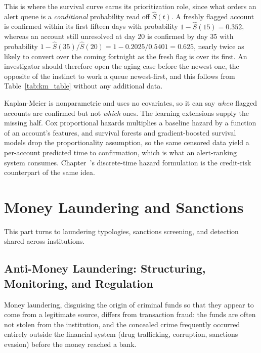 \documentclass[../ai_in_finance]{subfiles}
\begin{document}
This is where the survival curve earns its prioritization role, since what orders an alert queue is a \emph{conditional} probability read off $\hat S(t)$. A freshly flagged account is confirmed within its first fifteen days with probability $1 - \hat S(15) = 0.352$, whereas an account still unresolved at day 20 is confirmed by day 35 with probability $1 - \hat S(35)/\hat S(20) = 1 - 0.2025/0.5401 = 0.625$, nearly twice as likely to convert over the coming fortnight as the fresh flag is over its first. An investigator should therefore open the aging case before the newest one, the opposite of the instinct to work a queue newest-first, and this follows from Table~\ref{tab:km_table} without any additional data.

Kaplan-Meier is nonparametric and uses no covariates, so it can say \emph{when} flagged accounts are confirmed but not \emph{which} ones. The learning extensions supply the missing half. Cox proportional hazards multiplies a baseline hazard by a function of an account's features, and survival forests and gradient-boosted survival models drop the proportionality assumption, so the same censored data yield a per-account predicted time to confirmation, which is what an alert-ranking system consumes. Chapter~'s discrete-time hazard formulation is the credit-risk counterpart of the same idea.

\section{Money Laundering and Sanctions}

This part turns to laundering typologies, sanctions screening, and detection shared across institutions.

\subsection{Anti-Money Laundering: Structuring, Monitoring, and Regulation}
\label{sec:aml-structuring}

Money laundering, disguising the origin of criminal funds so that they appear to come from a legitimate source, differs from transaction fraud: the funds are often not stolen from the institution, and the concealed crime frequently occurred entirely outside the financial system (drug trafficking, corruption, sanctions evasion) before the money reached a bank.
\end{document}
